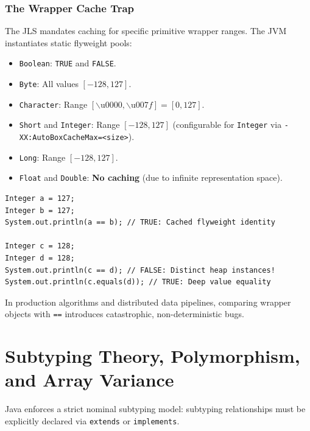 \documentclass[10pt,journal,compsoc,onecolumn]{IEEEtran}
\begin{document}
\subsubsection{The Wrapper Cache Trap}
The JLS mandates caching for specific primitive wrapper ranges. The JVM instantiates static flyweight pools:
\begin{itemize}
    \item \texttt{Boolean}: \texttt{TRUE} and \texttt{FALSE}.
    \item \texttt{Byte}: All values $[-128, 127]$.
    \item \texttt{Character}: Range $[\backslash\text{u}0000, \backslash\text{u}007f] = [0, 127]$.
    \item \texttt{Short} and \texttt{Integer}: Range $[-128, 127]$ (configurable for \texttt{Integer} via \texttt{-XX:AutoBoxCacheMax=<size>}).
    \item \texttt{Long}: Range $[-128, 127]$.
    \item \texttt{Float} and \texttt{Double}: \textbf{No caching} (due to infinite representation space).
\end{itemize}

\begin{lstlisting}[caption={The Autoboxing Reference Equality Pitfall}]
Integer a = 127;
Integer b = 127;
System.out.println(a == b); // TRUE: Cached flyweight identity

Integer c = 128;
Integer d = 128;
System.out.println(c == d); // FALSE: Distinct heap instances!
System.out.println(c.equals(d)); // TRUE: Deep value equality
\end{lstlisting}
In production algorithms and distributed data pipelines, comparing wrapper objects with \texttt{==} introduces catastrophic, non-deterministic bugs.

\section{Subtyping Theory, Polymorphism, and Array Variance}
\label{sec:subtyping}

Java enforces a strict nominal subtyping model: subtyping relationships must be explicitly declared via \texttt{extends} or \texttt{implements}.
\end{document}
